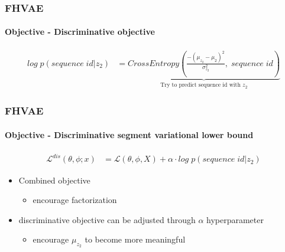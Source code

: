 \documentclass[9pt]{beamer}
\begin{document}
\begin{frame}
\frametitle{FHVAE}
\framesubtitle{Objective - Discriminative objective}
\begin{align*}
log\;p(sequence\;id | z_2)& = \underbrace{CrossEntropy(\frac{-(\mu_{z_2} - \mu_2)^2}{\sigma_{z_2}^2},\;sequence\;id)}_{\text{Try to predict sequence id with $z_2$}}
\end{align*}
\end{frame} 



\begin{frame}
\frametitle{FHVAE}
\framesubtitle{Objective - Discriminative segment variational lower bound}
\begin{align*}
\mathcal{L}^{dis}(\theta, \phi;x)& = \mathcal{L}(\theta, \phi, X) + \alpha \cdot log\;p(sequence\;id | z_2)
\end{align*}
\begin{itemize}
	\item Combined objective
	\begin{itemize}
		\item encourage factorization
	\end{itemize}
	\item discriminative objective can be adjusted through $\alpha$ hyperparameter
	\begin{itemize}
		\item encourage $\mu_{z_2}$ to become more meaningful
	\end{itemize}
\end{itemize}
\end{frame} 

\end{document}
